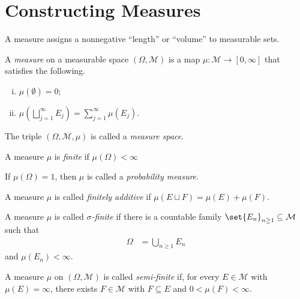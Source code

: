 \section{Constructing Measures}%
A measure assigns a nonnegative ``length'' or ``volume'' to measurable sets.
\begin{definition}\label{def:measure_basics}
  A \textit{measure} on a measurable space $\left(\Omega,\mathcal{M}\right)$ is a map $\mu\colon \mathcal{M}\rightarrow \left[0,\infty\right]$ that satisfies the following.
  \begin{enumerate}[(i)]
    \item $\mu\left(\emptyset\right) = 0$;
    \item $\displaystyle \mu\left(\bigsqcup_{j=1}^{\infty}E_j\right) = \sum_{j=1}^{\infty}\mu\left(E_j\right)$.
  \end{enumerate}
  The triple $\left(\Omega,\mathcal{M},\mu\right)$ is called a \textit{measure space}.\newline

  A measure $\mu$ is \textit{finite} if $\mu\left(\Omega\right) < \infty$\newline

  If $\mu\left(\Omega\right) = 1$, then $\mu$ is called a \textit{probability measure}.\newline

  A measure $\mu$ is called \textit{finitely additive} if $\mu\left(E\sqcup F\right) = \mu(E) + \mu(F)$.\newline

  A measure $\mu$ is called \textit{$\sigma$-finite} if there is a countable family $\set{E_n}_{n\geq 1}\subseteq \mathcal{M}$ such that
  \begin{align*}
    \Omega &= \bigcup_{n\geq 1}E_n
  \end{align*}
  and $\mu\left(E_n\right) < \infty$.\newline

  A measure $\mu$ on $\left(\Omega,\mathcal{M}\right)$ is called \textit{semi-finite} if, for every $E\in \mathcal{M}$ with $\mu(E) = \infty$, there exists $F\in \mathcal{M}$ with $F\subseteq E$ and $0 < \mu(F) < \infty$.
\end{definition}

